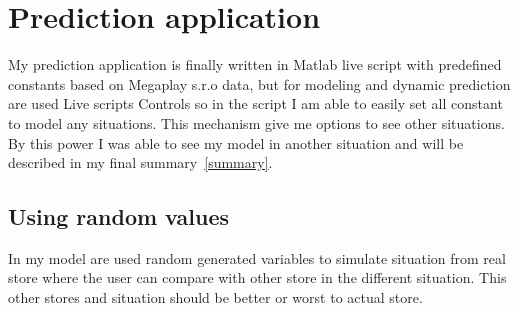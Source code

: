 \section{Prediction application} \label{sec:app}
My prediction application is finally written in Matlab live script with predefined constants based on Megaplay s.r.o data,
but for modeling and dynamic prediction are used Live scripts Controls so in the script I am able to easily set all constant to model any situations.
This mechanism give me options to see other situations.
By this power I was able to see my model in another situation and will be described in my final summary~\ref{summary}.\\
\subsection{Using random values} \label{subsec:rand}
In my model are used random generated variables to simulate situation from real store where the user can compare with other store in
the different situation.
This other stores and situation should be better or worst to actual store.
